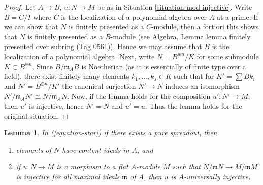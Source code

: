 \documentclass{amsart}
\theoremstyle{plain}
\newtheorem{lemma}[subsection]{Lemma}
\theoremstyle{definition}
\theoremstyle{remark}
\numberwithin{equation}{subsection}
\begin{document}
\begin{proof}
Let $A \to B$, $u : N \to M$ be as in Situation \ref{situation-mod-injective}.
Write $B = C/I$ where $C$ is the localization of a polynomial algebra
over $A$ at a prime. If we can show that $N$ is finitely presented as
a $C$-module, then a fortiori this shows that $N$ is finitely presented
as a $B$-module (see
Algebra, Lemma \href{https://stacks.math.columbia.edu/tag/0561}{lemma finitely presented over subring (Tag 0561)}).
Hence we may assume that $B$ is the localization of a polynomial algebra.
Next, write $N = B^{\oplus n}/K$ for some submodule $K \subset B^{\oplus n}$.
Since $B/\mathfrak m_AB$ is Noetherian (as it is essentially of finite type
over a field), there exist finitely many elements $k_1, \ldots, k_s \in K$
such that for $K' = \sum Bk_i$ and $N' = B^{\oplus n}/K'$ the
canonical surjection $N' \to N$ induces an isomorphism
$N'/\mathfrak m_AN' \cong N/\mathfrak m_AN$.
Now, if the lemma holds for the composition $u' : N' \to M$,
then $u'$ is injective, hence $N' = N$ and $u' = u$. Thus the lemma holds for
the original situation.
\end{proof}


\begin{lemma}
\label{lemma-properties-pure-spreadout}
In (\ref{equation-star}) if there exists a pure spreadout, then
\begin{enumerate}
\item elements of $N$ have content ideals in $A$, and
\item if $u : N \to M$ is a morphism to a flat $A$-module $M$
such that $N/\mathfrak m N \to M/\mathfrak m M$ is injective
for all maximal ideals $\mathfrak m$ of $A$, then $u$ is
$A$-universally injective.
\end{enumerate}
\end{lemma}
\end{document}
